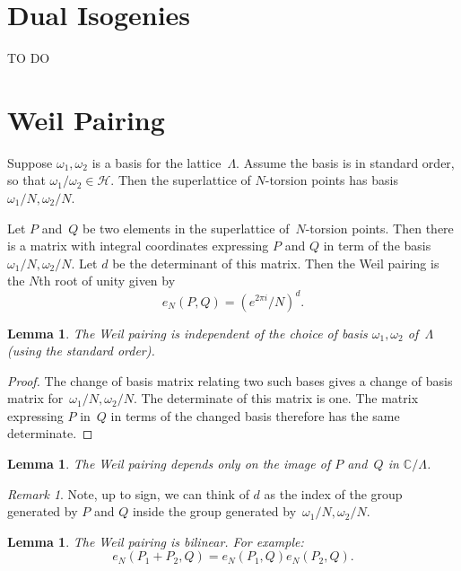\documentclass{article}
\theoremstyle{plain}
\newtheorem{lemma}[theorem]{Lemma}
\theoremstyle{definition}
\theoremstyle{remark}
\newtheorem{remark}[theorem]{Remark}
\newcommand{\C}{\mathbb{C}}
\newcommand{\h}{{\mathcal{H}}}
\begin{document}

\section{Dual Isogenies}

TO DO


\section{Weil Pairing}

Suppose $\omega_1, \omega_2$ is a basis for the lattice~$\Lambda$. Assume the basis
is in standard order, so that $\omega_1/\omega_2 \in \h$. Then the superlattice of $N$-torsion points has basis $\omega_1 / N,  \omega_2/N$. 

Let $P$ and~$Q$ be two elements in the superlattice of~$N$-torsion points. Then there is a matrix with integral coordinates expressing $P$ and $Q$ in term of
the basis~$\omega_1 / N,  \omega_2/N$. Let $d$ be the determinant of this matrix. Then
the Weil pairing is the $N$th root of unity given by
$$
e_N(P, Q) = \left(e^{2\pi i}/N\right)^d.
$$

\begin{lemma}
The Weil pairing is independent of the choice of basis $\omega_1, \omega_2$
of~$\Lambda$ (using the standard order).
\end{lemma}

\begin{proof}
The change of basis matrix relating two such bases gives a change of basis matrix 
for~$\omega_1 / N,  \omega_2/N$. The determinate of this matrix is one. The matrix expressing $P$ in~$Q$
in terms of the changed basis therefore has the same determinate. 
\end{proof}




\begin{lemma}
The Weil pairing depends only on the image of $P$ and~$Q$ in $\C/\Lambda$.
\end{lemma}

\begin{remark}
Note, up to sign, we can think of $d$ as the index of the group generated 
by $P$ and $Q$ inside the group generated by~$\omega_1 / N,  \omega_2/N$.
\end{remark}


\begin{lemma}
The Weil pairing is bilinear.
For example:  $$e_N(P_1 + P_2, Q) = e_N(P_1, Q) e_N(P_2, Q).$$
\end{lemma}
\end{document}
